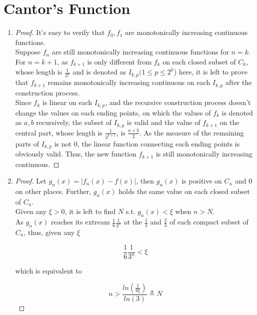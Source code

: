 \documentclass[paper=a4, fontsize=11pt]{scrartcl} %
\numberwithin{equation}{section} %
\numberwithin{figure}{section} %
\numberwithin{table}{section} %
\begin{document}
\section{Cantor's Function}
	\begin{enumerate}
		\item
			\begin{proof}
				It's easy to verify that $f_0, f_1$ are monotonically increasing continuous functions.\\
				Suppose $f_n$ are still monotonically increasing continuous functions for $ n = k$.\\
				For $n = k+1$, as $f_{k+1}$ is only different from $f_k$ on each closed subset of $C_k$, whose length is $\frac{1}{3^n}$ and is denoted as $I_{k, p} (1\leq p \leq 2^k$) here, it is left to prove that $f_{k+1}$ remains  monotonically increasing continuous on each $I_{k, p}$ after the construction process.\\
				Since $f_k$ is linear on each $I_{k, p}$, and the recursive construction process doesn't change the values on each ending points, on which the values of $f_k$ is denoted as $a, b$ recursively, the subset of $I_{k, p}$ is valid and the value of $f_{k+1}$ on the central part, whose length is $\frac{1}{3^{k+1}}$, is $\frac{a+b}{2}$. As the measure of the remaining parts of $I_{k, p}$ is not 0, the linear function connecting each ending points is obviously valid. Thus, the new function $f_{k+1}$ is still  monotonically increasing continuous.
			\end{proof}
		\item
			\begin{proof}
				Let $g_n(x) = \vert f_n(x) - f(x) \vert$, then $g_n(x)$ is positive on $C_n$ and 0 on other places. Further, $g_n(x)$ holds the same value on each closed subset of $C_n$.\\
				Given any $\xi > 0$, it is left to find $N$ s.t. $g_n(x) < \xi$ when $n > N$. \\
				As $g_n(x)$ reaches its extream $\frac{1}{6} \frac{1}{3^n}$ at the $\frac{1}{3}$ and $\frac{2}{3}$ of each compact subset of $C_n$, thus, given any $\xi$
				
				\begin{equation}
					\frac{1}{6} \frac{1}{3^n} < \xi
				\end{equation}
				
				which is equivalent to 
				
				\begin{equation}
					n > \frac{ln(\frac{1}{6\xi})}{ln(3)} \triangleq N
				\end{equation}
				

\end{proof}
\end{enumerate}
\end{document}
